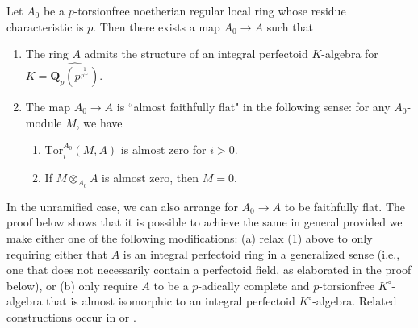 \documentclass[10pt,reqno]{amsart}
\begin{document}
\begin{proposition}
\label{prop:RegularPerfectoidFaithfullyFlat}
Let $A_0$ be a $p$-torsionfree noetherian regular local ring whose residue characteristic is $p$. Then there exists a map $A_0 \to A$ such that
\begin{enumerate}
\item The ring $A$ admits the structure of an integral perfectoid $K$-algebra for $K = \widehat{\mathbf{Q}_p(p^{\frac{1}{p^\infty}})}$.
\item The map $A_0 \to A$ is ``almost faithfully flat" in the following sense: for any $A_0$-module $M$, we have
\begin{enumerate}
\item $\mathrm{Tor}_i^{A_0}(M,A)$ is almost zero for $i > 0$.
\item If $M \otimes_{A_0} A$ is almost zero, then $M = 0$.
\end{enumerate}
\end{enumerate}
\end{proposition}

In the unramified case, we can also arrange for $A_0 \to A$ to be faithfully flat. The proof below shows that it is possible to achieve the same in general provided we make either one of the following modifications: (a) relax (1) above to only requiring either that $A$ is an integral perfectoid ring in a generalized sense (i.e., one that does not necessarily contain a perfectoid field, as elaborated in the proof below), or (b) only require $A$ to be a $p$-adically complete and $p$-torsionfree $K^\circ$-algebra that is almost isomorphic to an integral perfectoid $K^\circ$-algebra. Related constructions occur in \cite[Proposition 4.9]{ShimomotoAlmostPurity} or \cite[Example 3.4.6 (3)]{AndrePAL}.
\end{document}
